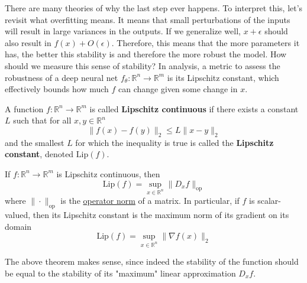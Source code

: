  There are many theories of why the last step ever happens. To interpret this, let's revisit what overfitting means. It means that small perturbations of the inputs will result in large variances in the outputs. If we generalize well, $x + \epsilon$ should also result in $f(x) + O(\epsilon)$. Therefore, this means that the more parameters it has, the better this stability is and therefore the more robust the model. How should we measure this sense of stability? In analysis, a metric to assess the robustness of a deep neural net $f_\theta: \mathbb{R}^n \to \mathbb{R}^m$ is its Lipschitz constant, which effectively bounds how much $f$ can change given some change in $x$. 

  \begin{definition}
    \label{def:lipschitz-continuity}
    A function $f: \mathbb{R}^n \to \mathbb{R}^m$ is called \textbf{Lipschitz continuous} if there exists a constant $L$ such that for all $x, y \in \mathbb{R}^n$
    \begin{equation}
      \|f(x) - f(y)\|_2 \leq L \|x - y\|_2
    \end{equation}
    and the smallest $L$ for which the inequality is true is called the \textbf{Lipschitz constant}, denoted $\mathrm{Lip}(f)$. 
  \end{definition}

  \begin{theorem}
    \label{thm:lipschitz-upper-bound-with-operator-norm-of}
    If $f: \mathbb{R}^n \to \mathbb{R}^m$ is Lipschitz continuous, then 
    \begin{equation}
      \mathrm{Lip}(f) = \sup_{x \in \mathbb{R}^n} \|D_x f\|_{\mathrm{op}}
    \end{equation}
    where $\|\cdot \|_{\mathrm{op}}$ is the \hyperref[lin-def:operator-norm-2]{operator norm} of a matrix. In particular, if $f$ is scalar-valued, then its Lipschitz constant is the maximum norm of its gradient on its domain 
    \begin{equation}
      \mathrm{Lip}(f) = \sup_{x \in \mathbb{R}^n} \|\nabla f(x)\|_2
    \end{equation}
  \end{theorem}

  The above theorem makes sense, since indeed the stability of the function should be equal to the stability of its "maximum" linear approximation $D_x f$. 

